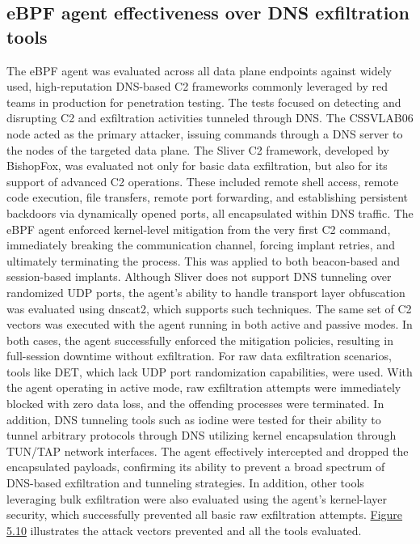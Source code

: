 \documentclass [11pt, proquest] {uwthesis}[2020/02/24]
\begin{document}
\subsection{eBPF agent effectiveness over DNS exfiltration tools}
The eBPF agent was evaluated across all data plane endpoints against widely used, high-reputation DNS-based C2 frameworks commonly leveraged by red teams in production for penetration testing. The tests focused on detecting and disrupting C2 and exfiltration activities tunneled through DNS. The CSSVLAB06 node acted as the primary attacker, issuing commands through a DNS server to the nodes of the targeted data plane.
The Sliver C2 framework, developed by BishopFox, was evaluated not only for basic data exfiltration, but also for its support of advanced C2 operations. These included remote shell access, remote code execution, file transfers, remote port forwarding, and establishing persistent backdoors via dynamically opened ports, all encapsulated within DNS traffic. The eBPF agent enforced kernel-level mitigation from the very first C2 command, immediately breaking the communication channel, forcing implant retries, and ultimately terminating the process. This was applied to both beacon-based and session-based implants.
Although Sliver does not support DNS tunneling over randomized UDP ports, the agent’s ability to handle transport layer obfuscation was evaluated using dnscat2, which supports such techniques. The same set of C2 vectors was executed with the agent running in both active and passive modes. In both cases, the agent successfully enforced the mitigation policies, resulting in full-session downtime without exfiltration.
For raw data exfiltration scenarios, tools like DET, which lack UDP port randomization capabilities, were used. With the agent operating in active mode, raw exfiltration attempts were immediately blocked with zero data loss, and the offending processes were terminated. In addition, DNS tunneling tools such as iodine were tested for their ability to tunnel arbitrary protocols through DNS utilizing kernel encapsulation through TUN/TAP network interfaces. The agent effectively intercepted and dropped the encapsulated payloads, confirming its ability to prevent a broad spectrum of DNS-based exfiltration and tunneling strategies. In addition, other tools leveraging bulk exfiltration were also evaluated using the agent’s kernel-layer security, which successfully prevented all basic raw exfiltration attempts.
\hyperref[tab:dns-framework-coverage]{Figure 5.10} illustrates the attack vectors prevented and all the tools evaluated. 
\end{document}
